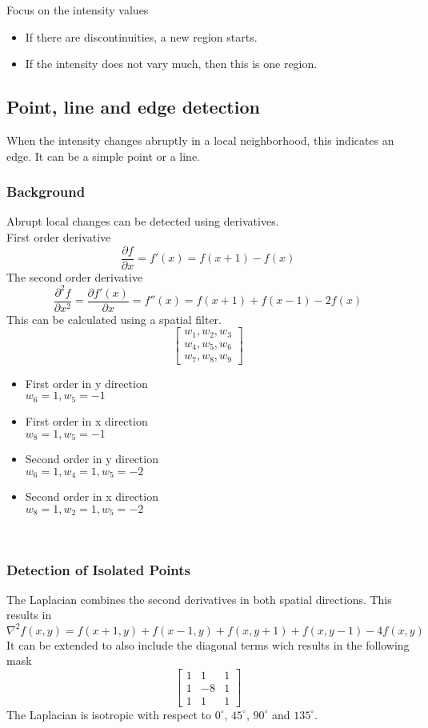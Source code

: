 Focus on the intensity values
\begin{itemize}
\item If there are discontinuities, a new region starts.
\item If the intensity does not vary much, then this is one region.
\end{itemize}

\subsection{Point, line and edge detection}
When the intensity changes abruptly in a local neighborhood, this indicates an edge. It can be a simple point or a line.

\begin{multicols}{2}
\subsubsection{Background}
Abrupt local changes can be detected using derivatives.\\
First order derivative
\[
	\frac{\partial f}{\partial x} = f'(x)=f(x+1)-f(x)
\]
The second order derivative
\[
	\frac{\partial^2f}{\partial x^2}=\frac{\partial f'(x)}{\partial x}=f''(x)=f(x+1)+f(x-1)-2f(x)
\]
This can be calculated using a spatial filter.
\[
	\begin{bmatrix}
	w_1, w_2, w_3\\
	w_4, w_5, w_6\\
	w_7, w_8, w_9
	\end{bmatrix}
\]

\columnbreak

\begin{itemize}
\item First order in y direction \\ $w_6=1, w_5=-1$
\item First order in x direction \\ $w_8=1, w_5=-1$
\item Second order in y direction \\ $w_6=1, w_4=1, w_5=-2$
\item Second order in x direction \\ $w_8=1, w_2=1, w_5=-2$
\end{itemize}
\ \\
\end{multicols}
\subsubsection{Detection of Isolated Points}
The Laplacian combines the second derivatives in both spatial directions. This results in
\[
	\nabla^2f(x,y)=f(x+1,y)+f(x-1,y)+f(x,y+1)+f(x,y-1)-4f(x,y)
\]
It can be extended to also include the diagonal terms wich results in the following mask
\[
	\begin{bmatrix}
	 1 & 1 & 1\\
	 1 & -8 & 1\\
	 1 & 1 & 1
	\end{bmatrix}
\]
The Laplacian is isotropic with respect to $0^\circ$, $45^\circ$, $90^\circ$ and $135^\circ$. \\

